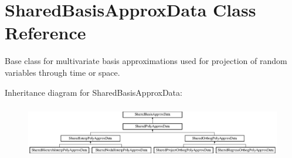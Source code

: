 \section{Shared\+Basis\+Approx\+Data Class Reference}
\label{classPecos_1_1SharedBasisApproxData}


Base class for multivariate basis approximations used for projection of random variables through time or space.  


Inheritance diagram for Shared\+Basis\+Approx\+Data\+:\begin{figure}[H]
\begin{center}
\leavevmode
\includegraphics[height=2.352941cm]{classPecos_1_1SharedBasisApproxData}
\end{center}
\end{figure}
